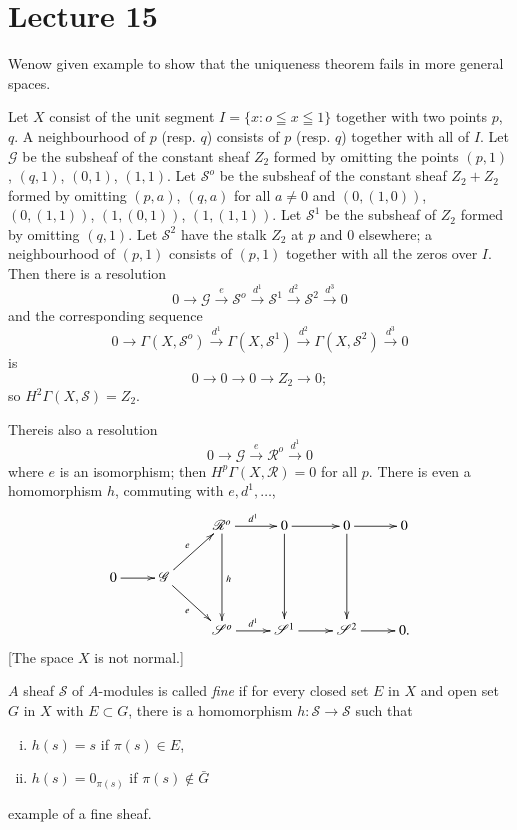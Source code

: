 \chapter{Lecture 15}\label{chap15:lec15}%

We\pageoriginale now given example to show that the uniqueness theorem
fails in more general spaces.  

\begin{exam}%
Let $X$  consist of the unit segment $I=\{ x: o \leqq x \leqq 1\}$
together with two points $p$, $q$. A neighbourhood of $p$ (resp. $q$)
consists of $p$ (resp. $q$) together with all of $I$. Let
$\mathscr{G}$ be the subsheaf of the constant sheaf $Z_2$ formed by
omitting the points $(p,1)$, $(q,1)$, $(0,1)$, $(1,1)$. Let
$\mathscr{S}^o$ be the subsheaf of the constant sheaf $Z_2 +Z_2$
formed by omitting 
$(p,a)$, $(q,a)$ for all $a \neq 0$ and $(0,(1,0))$, $(0,(1,1))$, $(1,(0,1))$,
$(1,(1,1))$. Let $\mathscr{S}^1$ be the subsheaf of $Z_2$ formed by
omitting $(q,1)$. Let $\mathscr{S}^2$ have the stalk $Z_2$ at $p$ and
0 elsewhere; a neighbourhood of $(p,1)$ consists of $(p,1)$ together
with all the zeros over $I$. Then there is a resolution 
$$
0 \to \mathscr{G} \xrightarrow{e} \mathscr{S}^o \xrightarrow{d^1}
\mathscr{S}^1 \xrightarrow{d^2} \mathscr{S}^2 \xrightarrow{d^3} 0  
$$
and the corresponding sequence
$$
0 \to \Gamma (X,\mathscr{S}^o) \xrightarrow{d^1}
\Gamma(X,\mathscr{S}^1) \xrightarrow{d^2} \Gamma(X, \mathscr{S}^2)
\xrightarrow{d^3} 0 
$$
is
$$
0 \to 0 \to 0 \to Z_2 \to 0 ; 
$$
so $H^2 \Gamma (X,\mathscr{S})=  Z_2$.
\end{exam}

There\pageoriginale is also a resolution 
$$
0 \to \mathscr{G} \xrightarrow{e} \mathscr{R}^o \xrightarrow{d^1} 0 
$$
where $e$ is an isomorphism; then $H^p \Gamma (X, \mathscr{R}) = 0$
for all $p$. There is even a homomorphism $h$, commuting with $e,d^1
,\ldots$,  
\[
\xymatrix{
& & \mathscr{R}^o \ar[r]^{d^1} \ar[dd]^h & 0
  \ar[r] \ar[dd] & 0 \ar[r]\ar[dd] & 0\\
0 \ar[r] & \mathscr{G} \ar[ur]^e \ar[dr]_e & & &&\\
& & \mathscr{S}^o \ar[r]^{d^1} & \mathscr{S}^1 \ar[r] &
\mathscr{S}^2 \ar[r] &0 .
}
\]
[The space $X$ is not normal.]

\begin{defi*}%
$A$ sheaf $\mathscr{S}$ of $A$-modules is called \textit{fine} if for
  every closed set $E$ in $X$ and open set $G$ in $X$ with $ E \subset
  G$, there is a homomorphism $ h : \mathscr{S} \to \mathscr{S}$ such
  that  
\begin{enumerate}[i)]
 \item $h (s) = s$ \quad if \quad $\pi (s) \in E$,

 \item $h (s) = 0_{\pi (s)}$ \quad if \quad $\pi (s) \notin \bar{G}$  
\end{enumerate}
 example of a fine sheaf.
\end{defi*}

